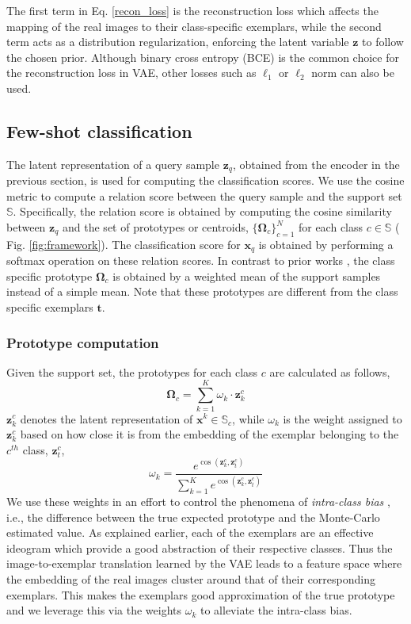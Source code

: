 The first term in Eq. \ref{recon_loss} is the reconstruction loss which affects the mapping of the real images to their class-specific exemplars, while the second term acts as a distribution regularization, enforcing the latent variable $\mathbf{z}$ to follow the chosen prior. Although binary cross entropy (BCE) is the common choice for the reconstruction loss in VAE, other losses such as $\ell_1$ or $\ell_2$ norm can also be used.

\subsection{Few-shot classification} \label{clf_mod}
The latent representation of a query sample $\mathbf{z}_q$, obtained from the encoder in the previous section, is used for computing the classification scores. We use the cosine metric to compute a relation score between the query sample and the support set $\mathbb{S}$. Specifically, the relation score is obtained by computing the cosine similarity between $\mathbf{z}_q$ and the set of prototypes or centroids, $\{\mathbf{\Omega}_{c}\}_{c=1}^{N}$ for each class $c \in \mathbb{S}$ ( Fig. \ref{fig:framework}). The classification score for $\mathbf{x}_q$ is obtained by performing a softmax operation on these relation scores. In contrast to prior works \cite{proto_net,peeler}, the class specific prototype $\mathbf{\Omega}_{c}$ is obtained by a weighted mean of the support samples instead of a simple mean. Note that these prototypes are different from the class specific exemplars $\mathbf{t}$.

\subsubsection*{Prototype computation} Given the support set, the prototypes for each class $c$ are calculated as follows,
\begin{equation}
    \mathbf{\Omega}_{c} = \sum\limits_{k=1}^{K}\omega_k \cdot \mathbf{z}_k^{c}
\end{equation}
$\mathbf{z}_k^{c}$ denotes the latent representation of $\mathbf{x}^k \in \mathbb{S}_c$, while
$\omega_k$ is the weight assigned to $\mathbf{z}_k^{c}$ based on how close it is from the embedding of the exemplar belonging to the $c^{th}$ class, $\mathbf{z}_t^{c}$,
\begin{equation}\label{proto_compute}
    \omega_k = \frac{e^{\cos(\mathbf{z}_k^{c},\mathbf{z}_t^{c})}}{\sum\limits_{k=1}^{K}e^{\cos(\mathbf{z}_k^{c},\mathbf{z}_t^{c})}}
\end{equation}
We use these weights in an effort to control the phenomena of \textit{intra-class bias} \cite{proto_rectify}, i.e.,  the difference between the true expected prototype and the Monte-Carlo estimated value. As explained earlier, each of the exemplars are an effective ideogram which provide a good abstraction of their respective classes. Thus the image-to-exemplar translation learned by the VAE leads to a feature space where the embedding of the real images cluster around that of their corresponding exemplars. This makes the exemplars good approximation of the true prototype and we leverage this via the weights $\omega_k$ to alleviate the intra-class bias.

